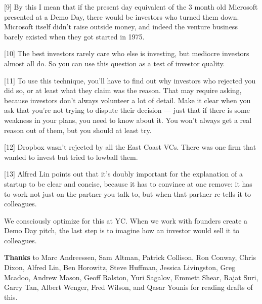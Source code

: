 [9] By this I mean that if the present day equivalent of the 3
                  month old Microsoft presented at a Demo Day, there would be
                  investors who turned them down. Microsoft itself didn't raise
                  outside money, and indeed the venture business barely existed
                  when they got started in 1975.

[10] The best investors rarely care who else is investing, but
                  mediocre investors almost all do. So you can use this question
                  as a test of investor quality.

[11] To use this technique, you'll have to find out why
                  investors who rejected you did so, or at least what they claim
                  was the reason. That may require asking, because investors
                  don't always volunteer a lot of detail. Make it clear when you
                  ask that you're not trying to dispute their decision ---
                  just that if there is some weakness in your plans, you need to
                  know about it. You won't always get a real reason out of them,
                  but you should at least try.

[12] Dropbox wasn't rejected by all the East Coast VCs. There
                  was one firm that wanted to invest but tried to lowball
                  them.

[13] Alfred Lin points out that it's doubly important for the
                  explanation of a startup to be clear and concise, because it
                  has to convince at one remove: it has to work not just on the
                  partner you talk to, but when that partner re-tells it to
                  colleagues.

We consciously optimize for this at YC.
                  When we work with founders create a Demo Day pitch, the last
                  step is to imagine how an investor would sell it to
                  colleagues.


                  \textbf{Thanks} to Marc Andreessen, Sam Altman, Patrick
                  Collison, Ron Conway, Chris Dixon, Alfred Lin, Ben Horowitz,
                  Steve Huffman, Jessica Livingston, Greg Mcadoo, Andrew Mason,
                  Geoff Ralston, Yuri Sagalov, Emmett Shear, Rajat Suri, Garry
                  Tan, Albert Wenger, Fred Wilson, and Qasar Younis for reading
                  drafts of this.




              
            
          
            
              
                


                  
              
            
          
